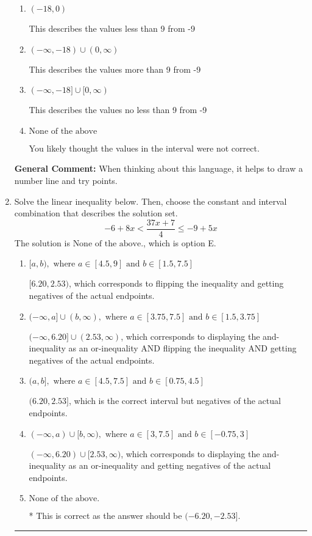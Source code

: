 \documentclass{extbook}[14pt]
\newcommand{\litem}[1]{\item #1

\rule{\textwidth}{0.4pt}}
\begin{document}
\begin{enumerate}
{\begin{enumerate}[label=\Alph*.]
This describes the values no more than 9 from -9
\item \( (-18, 0) \)

This describes the values less than 9 from -9
\item \( (-\infty, -18) \cup (0, \infty) \)

This describes the values more than 9 from -9
\item \( (-\infty, -18] \cup [0, \infty) \)

This describes the values no less than 9 from -9
\item \( \text{None of the above} \)

You likely thought the values in the interval were not correct.
\end{enumerate}

\textbf{General Comment:} When thinking about this language, it helps to draw a number line and try points.
}
\litem{
Solve the linear inequality below. Then, choose the constant and interval combination that describes the solution set.
\[ -6 + 8 x < \frac{37 x + 7}{4} \leq -9 + 5 x \]The solution is \( \text{None of the above.} \), which is option E.\begin{enumerate}[label=\Alph*.]
\item \( [a, b), \text{ where } a \in [4.5, 9] \text{ and } b \in [1.5, 7.5] \)

$[6.20, 2.53)$, which corresponds to flipping the inequality and getting negatives of the actual endpoints.
\item \( (-\infty, a] \cup (b, \infty), \text{ where } a \in [3.75, 7.5] \text{ and } b \in [1.5, 3.75] \)

$(-\infty, 6.20] \cup (2.53, \infty)$, which corresponds to displaying the and-inequality as an or-inequality AND flipping the inequality AND getting negatives of the actual endpoints.
\item \( (a, b], \text{ where } a \in [4.5, 7.5] \text{ and } b \in [0.75, 4.5] \)

$(6.20, 2.53]$, which is the correct interval but negatives of the actual endpoints.
\item \( (-\infty, a) \cup [b, \infty), \text{ where } a \in [3, 7.5] \text{ and } b \in [-0.75, 3] \)

$(-\infty, 6.20) \cup [2.53, \infty)$, which corresponds to displaying the and-inequality as an or-inequality and getting negatives of the actual endpoints.
\item \( \text{None of the above.} \)

* This is correct as the answer should be $(-6.20, -2.53]$.
\end{enumerate}

}
\end{enumerate}
\end{document}
